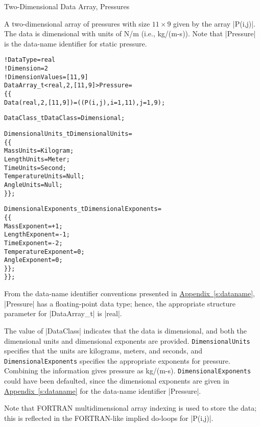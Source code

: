 \begin{example}{Two-Dimensional Data Array, Pressures}
\label{ex:data2}

A two-dimensional array of pressures with size $11\times 9$ given by the
array |P(i,j)|.
The data is dimensional with units of N/m (i.e., kg/(m-s)).
Note that |Pressure| is the data-name identifier for static pressure.
\begin{alltt}
  !  DataType = real
  !  Dimension = 2
  !  DimensionValues = [11,9]
  DataArray\_t<real, 2, [11,9]> Pressure =
    \{\{
    Data(real, 2, [11,9]) = ((P(i,j), i=1,11), j=1,9) ;
    
    DataClass\_t DataClass = Dimensional ;

    DimensionalUnits\_t DimensionalUnits =
      \{\{
      MassUnits        = Kilogram ;
      LengthUnits      = Meter ;
      TimeUnits        = Second ;
      TemperatureUnits = Null ;
      AngleUnits       = Null ;
      \}\} ;
	
    DimensionalExponents\_t DimensionalExponents =
      \{\{
      MassExponent        = +1 ;
      LengthExponent      = -1 ;
      TimeExponent        = -2 ;
      TemperatureExponent =  0 ;
      AngleExponent       =  0 ;
      \}\} ;
    \}\} ;
\end{alltt}
From the data-name identifier conventions presented in
\hyperref[s:dataname]{Appendix~\ref*{s:dataname}}, |Pressure| has a
floating-point data type; hence, the appropriate structure parameter
for |DataArray_t| is |real|.  

The value of |DataClass| indicates that the data is dimensional, and
both the dimensional units and dimensional exponents are provided.
\texttt{DimensionalUnits} specifies that the units are kilograms,
meters, and seconds, and \texttt{DimensionalExponents} specifies the
appropriate exponents for pressure.
Combining the information gives pressure as kg/(m-s).
\texttt{DimensionalExponents} could have been defaulted, since the
dimensional exponents are given in
\hyperref[s:dataname]{Appendix~\ref*{s:dataname}} for the data-name
identifier |Pressure|.

Note that FORTRAN multidimensional array indexing is used to store the data;
this is reflected in the FORTRAN-like implied do-loops for |P(i,j)|.
\end{example}

